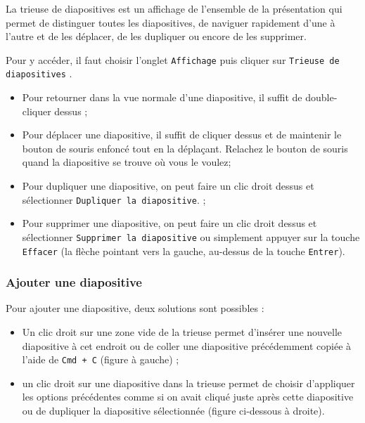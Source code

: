 La trieuse de diapositives est un affichage de l'ensemble de la présentation qui permet de distinguer toutes les diapositives, de naviguer rapidement d'une à l'autre et de les déplacer, de les dupliquer ou encore de les supprimer.

Pour y accéder, il faut choisir l'onglet \texttt{Affichage}  puis cliquer sur \texttt{Trieuse de diapositives} .


\begin{itemize}
	\item Pour retourner dans la vue normale d'une diapositive, il suffit de double-cliquer dessus ;
	\item Pour déplacer une diapositive, il suffit de cliquer dessus et de maintenir le bouton de souris enfoncé tout en la déplaçant. Relachez le bouton de souris quand la diapositive se trouve où vous le voulez;
	\item Pour dupliquer une diapositive, on peut faire un clic droit dessus et sélectionner \texttt{Dupliquer la diapositive}. ;
	\item Pour supprimer une diapositive, on peut faire un clic droit dessus et sélectionner \texttt{Supprimer la diapositive} ou simplement appuyer sur la touche \texttt{Effacer} (la flèche pointant vers la gauche, au-dessus de la touche \texttt{Entrer}).
\end{itemize}




\subsubsection{Ajouter une diapositive}\label{Presentation1nouvelleDiap}

Pour ajouter une diapositive, deux solutions sont possibles :

\begin{itemize}
\item Un clic droit sur une zone vide de la trieuse permet d'insérer une nouvelle diapositive à cet endroit ou de coller une diapositive précédemment copiée à l'aide de \texttt{Cmd + C} (figure à gauche) ; 
\item un clic droit sur une diapositive dans la trieuse permet de choisir d'appliquer les options précédentes comme si on avait cliqué juste après cette diapositive ou de dupliquer la diapositive sélectionnée (figure ci-dessous à droite).
\end{itemize}
	
